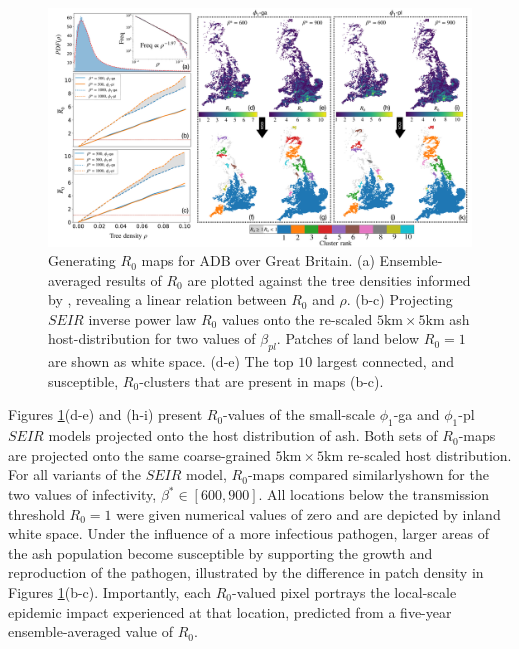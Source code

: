 \begin{landscape}
\begin{figure}
    \centering
    \includegraphics[scale=0.38]{chapter6/figures/fig6-R0-map-generation.pdf}
    \caption{Generating $R_0$ maps for ADB over Great Britain. (a) Ensemble-averaged results of $R_0$ are plotted against the tree densities informed by \cite{hill.data}, revealing a linear relation between $R_0$ and $\rho$. (b-c) Projecting $SEIR$ inverse power law $R_0$ values onto the re-scaled $5\mathrm{km} \times 5 \mathrm{km}$ ash host-distribution for two values of $\beta_{pl}$. Patches of land below $R_0 = 1$ are shown as white space. (d-e) The top $10$ largest connected, and susceptible, $R_0$-clusters that are present in maps (b-c).}
    \label{fig:R0-map-generation}
\end{figure}
\end{landscape}

Figures \ref{fig:R0-map-generation}(d-e) and (h-i) present $R_0$-values of the small-scale $\phi_1$-ga and $\phi_1$-pl $SEIR$ models projected onto the host distribution of ash.
Both sets of $R_0$-maps are projected onto the same coarse-grained $5\mathrm{km} \times 5\mathrm{km}$ re-scaled host distribution.
For all variants of the $SEIR$ model, $R_0$-maps compared similarly\textemdash shown for the two values of infectivity, $\beta^* \in [600, 900]$.
All locations below the transmission threshold $R_0=1$ were given numerical values of zero and are depicted by inland white space.
Under the influence of a more infectious pathogen, larger areas of the ash population become susceptible by supporting the growth and reproduction of the pathogen, illustrated by the difference in patch density in Figures \ref{fig:R0-map-generation}(b-c). 
Importantly, each $R_0$-valued pixel portrays the local-scale epidemic impact experienced at that location, predicted from a five-year ensemble-averaged value of $R_0$.

